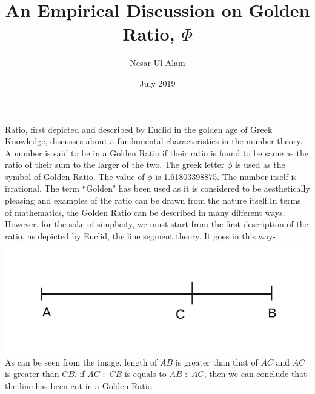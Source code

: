 \documentclass[12pt]{extarticle}\usepackage[utf8]{inputenc}\usepackage{cite}\usepackage{graphicx}\title{An Empirical Discussion on Golden Ratio, $\Phi$}\author{Nesar Ul Alam}\date{July 2019}
\begin{document}
\maketitleGolden Ratio, first depicted and described by Euclid in the golden age of Greek Knowledge, discusses about a fundamental characteristics in the number theory. A number is said to be in a Golden Ratio if their ratio is found to be same as the ratio of their sum to the larger of the two. The greek letter $\phi$ is used as the symbol of Golden Ratio. The value of $\phi$ is 1.61803398875. The number itself is irrational. The term ``Golden" has been used as it is considered to be aesthetically pleasing and examples of the ratio can be drawn from the nature itself.In terms of mathematics, the Golden Ratio can be described in many different ways. However, for the sake of simplicity, we must start from the first description of the ratio, as depicted by Euclid, the line segment theory. It goes in this way- \includegraphics[]{ffUntitled.png}As can be seen from the image, length of $AB$ is greater than that of $AC$ and $AC$ is greater than $CB$. if $AC$ $:$ $CB$ is equals to $AB$ $:$ $AC$, then we can conclude that the line has been cut in a Golden Ratio \cite{livio2008golden}. 
\end{document}
